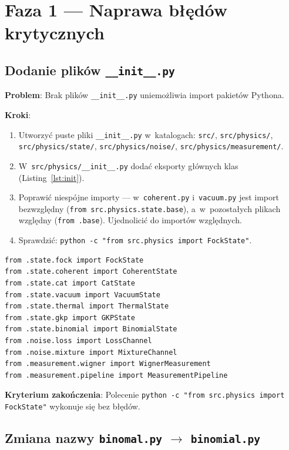\documentclass[12pt,a4paper]{article}
\begin{document}
\section{Faza 1 --- Naprawa błędów krytycznych}
\label{sec:faza1}

\subsection{Dodanie plików \texttt{\_\_init\_\_.py}}

\textbf{Problem}: Brak plików \texttt{\_\_init\_\_.py} uniemożliwia import pakietów Pythona.

\textbf{Kroki}:
\begin{enumerate}
    \item Utworzyć puste pliki \texttt{\_\_init\_\_.py} w~katalogach: \texttt{src/}, \texttt{src/physics/}, \texttt{src/physics/state/}, \texttt{src/physics/noise/}, \texttt{src/physics/measurement/}.
    \item W~\texttt{src/physics/\_\_init\_\_.py} dodać eksporty głównych klas (Listing~\ref{lst:init}).
    \item Poprawić niespójne importy --- w~\texttt{coherent.py} i~\texttt{vacuum.py} jest import bezwzględny (\texttt{from src.physics.state.base}), a~w~pozostałych plikach względny (\texttt{from .base}). Ujednolicić do importów względnych.
    \item Sprawdzić: \texttt{python -c "from src.physics import FockState"}.
\end{enumerate}

\begin{lstlisting}[caption={Proponowana zawartość \texttt{src/physics/\_\_init\_\_.py}.}, label={lst:init}]
from .state.fock import FockState
from .state.coherent import CoherentState
from .state.cat import CatState
from .state.vacuum import VacuumState
from .state.thermal import ThermalState
from .state.gkp import GKPState
from .state.binomial import BinomialState
from .noise.loss import LossChannel
from .noise.mixture import MixtureChannel
from .measurement.wigner import WignerMeasurement
from .measurement.pipeline import MeasurementPipeline
\end{lstlisting}

\textbf{Kryterium zakończenia}: Polecenie \texttt{python -c "from src.physics import FockState"} wykonuje się bez błędów.

\subsection{Zmiana nazwy \texttt{binomal.py} $\to$ \texttt{binomial.py}}
\end{document}
